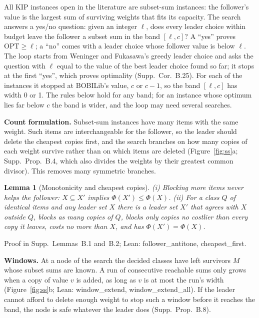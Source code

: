 \documentclass[]{spie}  %
\theoremstyle{plain}
\newtheorem{lem}[thm]{Lemma}
\newcommand{\lean}[1]{\mbox{\ttfamily #1}}   %
\newcommand{\OPT}{\mathrm{OPT}}
\begin{document}
All \NumNewKip{} KIP instances open in the literature are subset-sum instances: the follower's
value is the largest sum of surviving weights that fits its capacity. The search answers a
yes/no question: given an integer $\ell$, does every leader choice within budget leave the
follower a subset sum in the band $[\ell,c]$? A ``yes'' proves $\OPT\ge\ell$; a ``no'' comes with
a leader choice whose follower value is below $\ell$. The loop starts from Weninger and
Fukasawa's greedy leader choice and asks the question with $\ell$ equal to the value of the best
leader choice found so far; it stops at the first ``yes'', which proves optimality (Supp.\
Cor.~B.25). For each of the \NumNewKip{} instances it stopped at BOBILib's value, $c$ or $c-1$, so
the band $[\ell,c]$ has width 0 or 1. The rules below hold for any band; for an instance whose
optimum lies far below $c$ the band is wider, and the loop may need several searches.

\textbf{Count formulation.} Subset-sum instances have many items with the same weight. Such items
are interchangeable for the follower, so the leader should delete the cheapest copies first,
and the search branches on how many copies of each weight survive rather than on which items
are deleted (Figure~\ref{fig:ss}a; Supp.\ Prop.~B.4, which also divides the weights by their
greatest common divisor). This removes many symmetric branches.

\begin{lem}[Monotonicity and cheapest copies]\label{lem:count}
(i) Blocking more items never helps the follower: $X\subseteq X'$ implies $\Phi(X')\le\Phi(X)$.
(ii) For a class $Q$ of identical items and any leader set $X$ there is a leader set $X'$ that
agrees with $X$ outside $Q$, blocks as many copies of $Q$, blocks only copies no costlier than
every copy it leaves, costs no more than $X$, and has $\Phi(X')=\Phi(X)$.
\end{lem}
\noindent Proof in Supp.\ Lemmas~B.1 and~B.2; Lean: \lean{follower\_antitone},
\lean{cheapest\_first}.

\textbf{Windows.} At a node of the search the decided classes have left survivors $M$ whose subset
sums are known. A run of consecutive reachable sums only grows when a copy of value $v$ is added,
as long as $v$ is at most the run's width (Figure~\ref{fig:ss}b; Lean: \lean{window\_extend},
\lean{window\_extend\_all}). If the leader cannot afford to delete enough weight to stop such a
window before it reaches the band, the node is safe whatever the leader does (Supp.\
Prop.~B.8).
\end{document}
